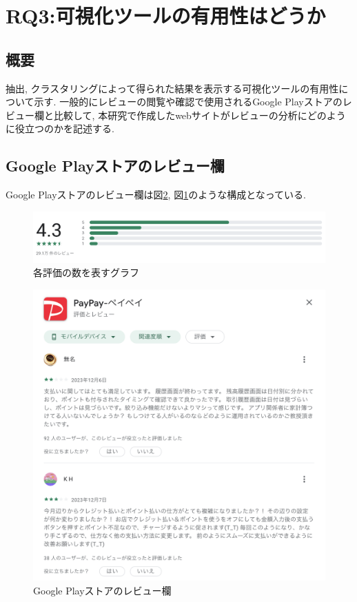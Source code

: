 
\section{RQ3:可視化ツールの有用性はどうか}
\subsection{概要}
抽出, クラスタリングによって得られた結果を表示する可視化ツールの有用性について示す. 一般的にレビューの閲覧や確認で使用されるGoogle Playストアのレビュー欄と比較して, 本研究で作成したwebサイトがレビューの分析にどのように役立つのかを記述する. 

\subsection{Google Playストアのレビュー欄}
Google Playストアのレビュー欄は図\ref{fig:google_play}, 図\ref{fig:google_play_graph}のような構成となっている. 

\begin{figure}[H]
  \centering
  \includegraphics[scale=0.4]
    {contents/images/google_play_graph.png}
  \caption{各評価の数を表すグラフ\label{fig:google_play_graph}}
\end{figure}

\begin{figure}[H]
  \centering
  \includegraphics[scale=0.4]
    {contents/images/google_play.png}
  \caption{Google Playストアのレビュー欄\label{fig:google_play}}
\end{figure}

